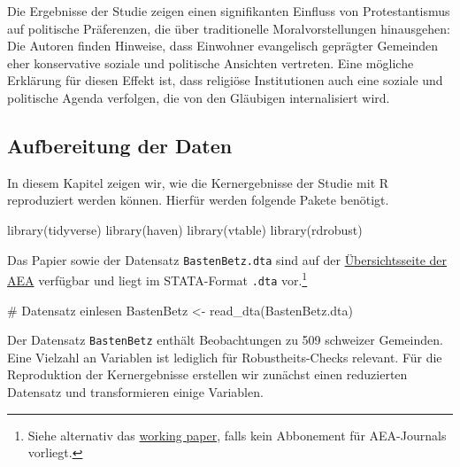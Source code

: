 \documentclass[
  a4paper,
  DIV=11,
  oneside]{scrreprt}
\newenvironment{Shaded}{\begin{snugshade}}{\end{snugshade}}
\newcommand{\CommentTok}[1]{\textcolor[rgb]{0.37,0.37,0.37}{#1}}
\newcommand{\FunctionTok}[1]{\textcolor[rgb]{0.28,0.35,0.67}{#1}}
\newcommand{\NormalTok}[1]{\textcolor[rgb]{0.00,0.23,0.31}{#1}}
\newcommand{\OtherTok}[1]{\textcolor[rgb]{0.00,0.23,0.31}{#1}}
\newcommand{\StringTok}[1]{\textcolor[rgb]{0.13,0.47,0.30}{#1}}
\begin{document}
Die Ergebnisse der Studie zeigen einen signifikanten Einfluss von
Protestantismus auf politische Präferenzen, die über traditionelle
Moralvorstellungen hinausgehen: Die Autoren finden Hinweise, dass
Einwohner evangelisch geprägter Gemeinden eher konservative soziale und
politische Ansichten vertreten. Eine mögliche Erklärung für diesen
Effekt ist, dass religiöse Institutionen auch eine soziale und
politische Agenda verfolgen, die von den Gläubigen internalisiert wird.

\hypertarget{aufbereitung-der-daten}{%
\subsection{Aufbereitung der Daten}\label{aufbereitung-der-daten}}

In diesem Kapitel zeigen wir, wie die Kernergebnisse der Studie mit R
reproduziert werden können. Hierfür werden folgende Pakete benötigt.

\begin{Shaded}
\begin{Highlighting}[]
\FunctionTok{library}\NormalTok{(tidyverse)}
\FunctionTok{library}\NormalTok{(haven)}
\FunctionTok{library}\NormalTok{(vtable)}
\FunctionTok{library}\NormalTok{(rdrobust)}
\end{Highlighting}
\end{Shaded}

Das Papier sowie der Datensatz \texttt{BastenBetz.dta} sind auf der
\href{https://www.aeaweb.org/articles?id=10.1257/pol.5.3.67}{Übersichtsseite
der AEA} verfügbar und liegt im STATA-Format \texttt{.dta}
vor.\footnote{Siehe alternativ das
  \href{https://papers.ssrn.com/sol3/papers.cfm?abstract_id=2133848}{working
  paper}, falls kein Abbonement für AEA-Journals vorliegt.}

\begin{Shaded}
\begin{Highlighting}[]
\CommentTok{\# Datensatz einlesen}
\NormalTok{BastenBetz }\OtherTok{\textless{}{-}} \FunctionTok{read\_dta}\NormalTok{(}\StringTok{\textquotesingle{}BastenBetz.dta\textquotesingle{}}\NormalTok{)}
\end{Highlighting}
\end{Shaded}

Der Datensatz \texttt{BastenBetz} enthält Beobachtungen zu 509 schweizer
Gemeinden. Eine Vielzahl an Variablen ist lediglich für
Robustheits-Checks relevant. Für die Reproduktion der Kernergebnisse
erstellen wir zunächst einen reduzierten Datensatz und transformieren
einige Variablen.
\end{document}
